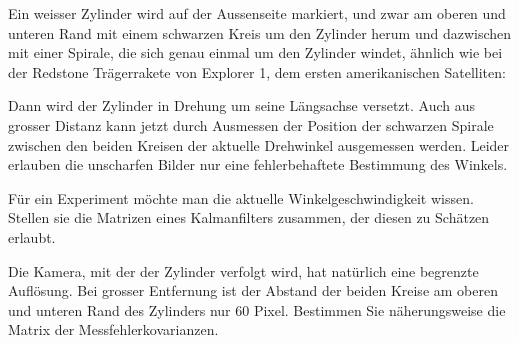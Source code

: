Ein weisser Zylinder wird auf der Aussenseite markiert, und zwar
am oberen und unteren Rand mit einem schwarzen Kreis um den Zylinder
herum und dazwischen mit einer Spirale, die sich genau einmal
um den Zylinder windet, ähnlich wie bei der Redstone Trägerrakete von
Explorer 1, dem ersten amerikanischen Satelliten:
\begin{center}
\end{center}
Dann wird der Zylinder in Drehung um seine Längsachse versetzt.
Auch aus grosser Distanz kann jetzt durch Ausmessen der Position
der schwarzen Spirale zwischen den beiden Kreisen der aktuelle Drehwinkel
ausgemessen werden. Leider erlauben die unscharfen Bilder nur
eine fehlerbehaftete Bestimmung des Winkels.
\begin{teilaufgaben}
\item
Für ein Experiment
möchte man die aktuelle Winkelgeschwindigkeit wissen.
Stellen sie die Matrizen eines Kalmanfilters zusammen, der
diesen zu Schätzen erlaubt.
\item
Die Kamera, mit der der Zylinder verfolgt wird, hat natürlich eine
begrenzte Auflösung. Bei grosser Entfernung ist der Abstand der
beiden Kreise am oberen und unteren Rand des Zylinders nur 60 Pixel.
Bestimmen Sie näherungsweise die Matrix der Messfehlerkovarianzen.
\end{teilaufgaben}


